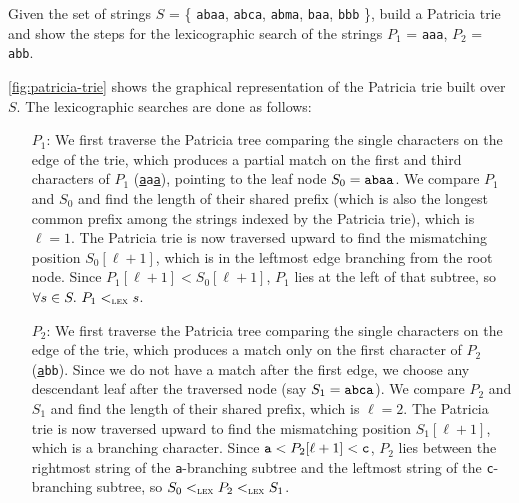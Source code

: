 \exercise

Given the set of strings $S$ = \{ {\tt abaa}, {\tt abca}, {\tt abma}, {\tt baa},
{\tt bbb} \}, build a Patricia trie and show the steps for the lexicographic
search of the strings $P_1$ = {\tt aaa}, $P_2$ = {\tt abb}.

\solution

\autoref{fig:patricia-trie} shows the graphical representation of the Patricia
trie built over $S$. The lexicographic searches are done as follows:
%
\begin{itemize}

  \item[$P_1$:] We first traverse the Patricia tree comparing the single
  characters on the edge of the trie, which produces a partial match on the
  first and third characters of $P_1$ ({\tt \underline{a}a\underline{a}}),
  pointing to the leaf node $S_0 = \text{\tt abaa}$. We compare $P_1$ and $S_0$
  and find the length of their shared prefix (which is also the longest common
  prefix among the strings indexed by the Patricia trie), which is $\ell = 1$.
  The Patricia trie is now traversed upward to find the mismatching position
  $S_0[\ell + 1]$, which is in the leftmost edge branching from the root node.
  Since $P_1[\ell + 1] < S_0[\ell + 1]$, $P_1$ lies at the left of that subtree,
  so $\forall s \in S.\ P_1 <_{\text{\sc lex}} s$.

  \item[$P_2$:] We first traverse the Patricia tree comparing the single
  characters on the edge of the trie, which produces a match only on the first
  character of $P_2$ ({\tt \underline{a}bb}). Since we do not have a match after
  the first edge, we choose any descendant leaf after the traversed node (say
  $S_1 = \text{\tt abca}$). We compare $P_2$ and $S_1$ and find the length of
  their shared prefix, which is $\ell = 2$. The Patricia trie is now traversed
  upward to find the mismatching position $S_1[\ell + 1]$, which is a branching
  character. Since $\text{\tt a} < P_2[\ell + 1] < \text{\tt c}$, $P_2$ lies
  between the rightmost string of the {\tt a}-branching subtree and the leftmost
  string of the {\tt c}-branching subtree, so $S_0 <_{\text{\sc lex}} P_2
  <_{\text{\sc lex}} S_1$.

\end{itemize}
%
